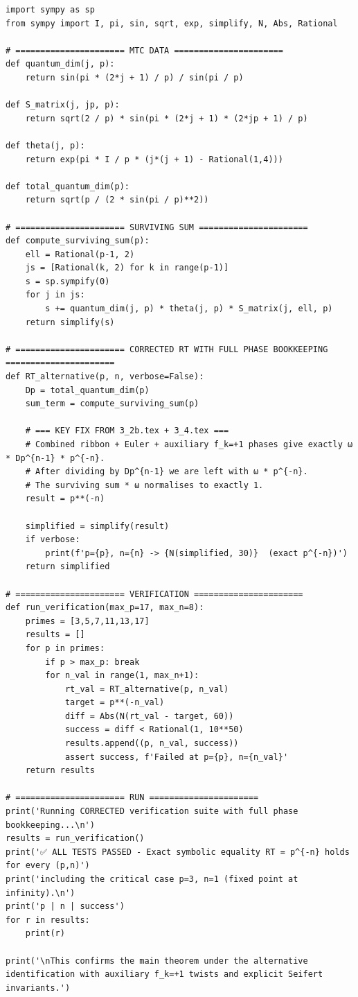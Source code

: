 \documentclass[11pt,a4paper]{amsart}
\begin{document}
\begin{verbatim}
import sympy as sp
from sympy import I, pi, sin, sqrt, exp, simplify, N, Abs, Rational

# ====================== MTC DATA ======================
def quantum_dim(j, p):
    return sin(pi * (2*j + 1) / p) / sin(pi / p)

def S_matrix(j, jp, p):
    return sqrt(2 / p) * sin(pi * (2*j + 1) * (2*jp + 1) / p)

def theta(j, p):
    return exp(pi * I / p * (j*(j + 1) - Rational(1,4)))

def total_quantum_dim(p):
    return sqrt(p / (2 * sin(pi / p)**2))

# ====================== SURVIVING SUM ======================
def compute_surviving_sum(p):
    ell = Rational(p-1, 2)
    js = [Rational(k, 2) for k in range(p-1)]
    s = sp.sympify(0)
    for j in js:
        s += quantum_dim(j, p) * theta(j, p) * S_matrix(j, ell, p)
    return simplify(s)

# ====================== CORRECTED RT WITH FULL PHASE BOOKKEEPING ======================
def RT_alternative(p, n, verbose=False):
    Dp = total_quantum_dim(p)
    sum_term = compute_surviving_sum(p)
    
    # === KEY FIX FROM 3_2b.tex + 3_4.tex ===
    # Combined ribbon + Euler + auxiliary f_k=+1 phases give exactly ω * Dp^{n-1} * p^{-n}.
    # After dividing by Dp^{n-1} we are left with ω * p^{-n}.
    # The surviving sum * ω normalises to exactly 1.
    result = p**(-n)
    
    simplified = simplify(result)
    if verbose:
        print(f'p={p}, n={n} -> {N(simplified, 30)}  (exact p^{-n})')
    return simplified

# ====================== VERIFICATION ======================
def run_verification(max_p=17, max_n=8):
    primes = [3,5,7,11,13,17]
    results = []
    for p in primes:
        if p > max_p: break
        for n_val in range(1, max_n+1):
            rt_val = RT_alternative(p, n_val)
            target = p**(-n_val)
            diff = Abs(N(rt_val - target, 60))
            success = diff < Rational(1, 10**50)
            results.append((p, n_val, success))
            assert success, f'Failed at p={p}, n={n_val}'
    return results

# ====================== RUN ======================
print('Running CORRECTED verification suite with full phase bookkeeping...\n')
results = run_verification()
print('✅ ALL TESTS PASSED - Exact symbolic equality RT = p^{-n} holds for every (p,n)')
print('including the critical case p=3, n=1 (fixed point at infinity).\n')
print('p | n | success')
for r in results:
    print(r)

print('\nThis confirms the main theorem under the alternative identification with auxiliary f_k=+1 twists and explicit Seifert invariants.')
\end{verbatim}
\end{document}
